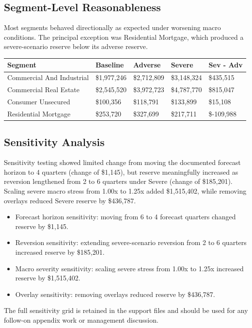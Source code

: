 \documentclass[11pt]{article}
\begin{document}
\subsection*{Segment-Level Reasonableness}
Most segments behaved directionally as expected under worsening macro conditions. The principal exception was Residential Mortgage, which produced a severe-scenario reserve below its adverse reserve.
\begin{center}
\small
\begin{tabularx}{\textwidth}{>{\raggedright\arraybackslash}p{}>{\raggedright\arraybackslash}p{}>{\raggedright\arraybackslash}p{}>{\raggedright\arraybackslash}p{}>{\raggedright\arraybackslash}p{}}
\toprule
Segment & Baseline & Adverse & Severe & Sev - Adv \\
\midrule
Commercial And Industrial & \$1,977,246 & \$2,712,809 & \$3,148,324 & \$435,515 \\
Commercial Real Estate & \$2,545,520 & \$3,972,723 & \$4,787,770 & \$815,047 \\
Consumer Unsecured & \$100,356 & \$118,791 & \$133,899 & \$15,108 \\
Residential Mortgage & \$253,720 & \$327,699 & \$217,711 & \$-109,988 \\
\bottomrule
\end{tabularx}
\normalsize
\end{center}
\subsection*{Sensitivity Analysis}
Sensitivity testing showed limited change from moving the documented forecast horizon to 4 quarters (change of \$1,145), but reserve meaningfully increased as reversion lengthened from 2 to 6 quarters under Severe (change of \$185,201). Scaling severe macro stress from 1.00x to 1.25x added \$1,515,402, while removing overlays reduced Severe reserve by \$436,787.
\begin{itemize}
\item Forecast horizon sensitivity: moving from 6 to 4 forecast quarters changed reserve by \$1,145.
\item Reversion sensitivity: extending severe-scenario reversion from 2 to 6 quarters increased reserve by \$185,201.
\item Macro severity sensitivity: scaling severe stress from 1.00x to 1.25x increased reserve by \$1,515,402.
\item Overlay sensitivity: removing overlays reduced reserve by \$436,787.
\end{itemize}
The full sensitivity grid is retained in the support files and should be used for any follow-on appendix work or management discussion.
\end{document}

